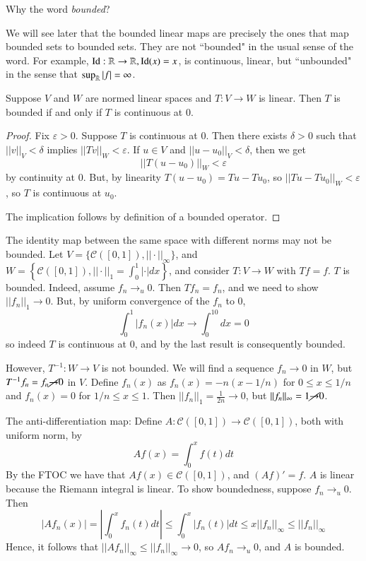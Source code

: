 \begin{qst}
    Why the word \emph{bounded}?
\end{qst}
We will see later that the bounded linear maps are precisely the ones that map bounded sets to bounded sets. They are not ``bounded" in the usual sense of the word. For example, $\operatorname{Id}:\mathbb R\rightarrow \mathbb R, \operatorname{Id}(x) = x$, is continuous, linear, but ``unbounded" in the sense that $\sup_{\mathbb R}|f| = \infty$.

\begin{prop}
    Suppose $V$ and $W$ are normed linear spaces and $T:V\rightarrow W$ is linear. Then $T$ is bounded if and only if $T$ is continuous at $0$.
\end{prop}
\begin{proof}
    Fix $\varepsilon > 0$. Suppose $T$ is continuous at $0$. Then there exists $\delta > 0$ such that $||v||_V < \delta$ implies $||Tv||_W < \varepsilon$. If $u \in V$ and $||u-u_0||_V < \delta$, then we get $$||T(u-u_0)||_W < \varepsilon$$ by continuity at $0$. But, by linearity $T(u-u_0) = Tu - Tu_0$, so $||Tu-Tu_0||_W <\varepsilon$, so $T$ is continuous at $u_0$.

    The implication follows by definition of a bounded operator.
\end{proof}

\begin{eg}
    The identity map between the same space with different norms may not be bounded. Let $V = \{\mathcal{C}([0,1]),||\cdot||_{\infty}\}$, and $W = \left\{\mathcal{C}([0,1]),||\cdot||_1 = \int_0^1|\cdot|dx\right\}$, and consider $T:V\rightarrow W$ with $Tf = f$. $T$ is bounded. Indeed, assume $f_n\rightarrow_u0$. Then $Tf_n = f_n$, and we need to show $||f_n||_1 \rightarrow 0$. But, by uniform convergence of the $f_n$ to $0$, $$\int_0^1|f_n(x)|dx\rightarrow \int_0^10dx = 0$$ so indeed $T$ is continuous at $0$, and by the last result is consequently bounded. 

    However, $T^{-1}:W\rightarrow V$ is not bounded. We will find a sequence $f_n\rightarrow 0$ in $W$, but $T^{-1}f_n = f_n\cancel{\rightarrow}0$ in $V$. Define $f_n(x)$ as $f_n(x) = -n(x-1/n)$ for $0 \leq x \leq 1/n$ and $f_n(x) = 0$ for $1/n\leq x\leq 1$. Then $||f_n||_1 = \frac{1}{2n}\rightarrow 0$, but $||f_n||_{\infty} = 1\cancel{\rightarrow} 0$.
\end{eg}


\begin{eg}
    The anti-differentiation map: Define $A:\mathcal{C}([0,1])\rightarrow \mathcal{C}([0,1])$, both with uniform norm, by $$Af(x) = \int_0^xf(t)dt$$ By the FTOC we have that $Af(x) \in \mathcal{C}([0,1])$, and $(Af)' = f$. $A$ is linear because the Riemann integral is linear. To show boundedness, suppose $f_n\rightarrow_u0$. Then $$|Af_n(x)| = \left|\int_0^xf_n(t)dt\right| \leq \int_0^x|f_n(t)|dt \leq x||f_n||_{\infty} \leq ||f_n||_{\infty}$$ Hence, it follows that $||Af_n||_{\infty} \leq ||f_n||_{\infty} \rightarrow 0$, so $Af_n\rightarrow_u0$, and $A$ is bounded.
\end{eg}

